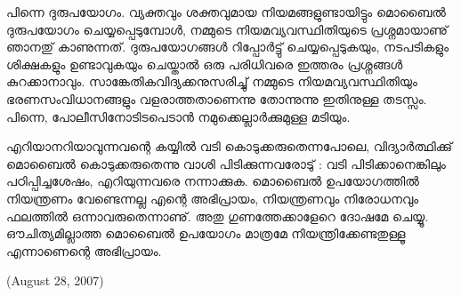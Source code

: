 പിന്നെ ദുരുപയോഗം. വ്യക്തവും ശക്തവുമായ നിയമങ്ങളുണ്ടായിട്ടും മൊബൈല്‍ ദുരുപയോഗം ചെയ്യപ്പെടുമ്പോള്‍,
 നമ്മുടെ നിയമവ്യവസ്ഥിതിയുടെ പ്രശ്നമായാണു് ഞാനതു് കാണുന്നത്. ദുരുപയോഗങ്ങള്‍ റിപ്പോര്‍ട്ടു് ചെയ്യപ്പെടുകയും,
 നടപടികളും ശിക്ഷകളും ഉണ്ടാവുകയും ചെയ്താല്‍ ഒരു പരിധിവരെ ഇത്തരം പ്രശ്നങ്ങള്‍ കുറക്കാനാവും. 
സാങ്കേതികവിദ്യക്കനുസരിച്ചു് നമ്മുടെ നിയമവ്യവസ്ഥിതിയും ഭരണസംവിധാനങ്ങളും വളരാത്തതാണെന്നു തോന്നുന്നു
 ഇതിനുള്ള തടസ്സം. പിന്നെ, പോലീസിനോടിടപെടാന്‍ നമുക്കെല്ലാര്‍ക്കുമുള്ള മടിയും.

എറിയാനറിയാവുന്നവന്റെ കയ്യില്‍ വടി കൊടുക്കരുതെന്നപോലെ, വിദ്യാര്‍ത്ഥിക്കു് മൊബൈല്‍ കൊടുക്കരുതെന്നു വാശി 
പിടിക്കുന്നവരോടു് : വടി പിടിക്കാനെങ്കിലും പഠിപ്പിച്ചശേഷം, എറിയുന്നവരെ നന്നാക്കുക. മൊബൈല്‍ ഉപയോഗത്തില്‍ നിയന്ത്രണം 
വേണ്ടെന്നല്ല എന്റെ അഭിപ്രായം, നിയന്ത്രണവും നിരോധനവും ഫലത്തില്‍ ഒന്നാവരുതെന്നാണു്. അതു ഗുണത്തേക്കാളേറെ 
ദോഷമേ ചെയ്യൂ. ഔചിത്യമില്ലാത്ത മൊബൈല്‍ ഉപയോഗം മാത്രമേ നിയന്ത്രിക്കേണ്ടതുള്ളൂ എന്നാണെന്റെ അഭിപ്രായം.

\hspace*{2em}(August 28, 2007)
\newpage

